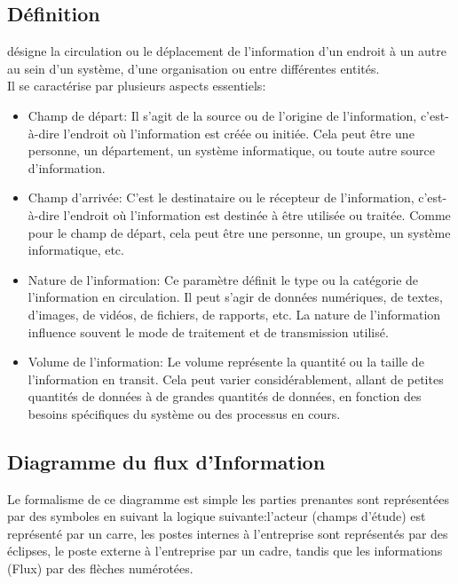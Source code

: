     \subsection{Définition}
        désigne la circulation ou le déplacement de l'information d'un endroit à un autre au sein d'un système, 
        d'une organisation ou entre différentes entités. \\
        Il se caractérise par plusieurs aspects essentiels:
        \begin{itemize}
            \item Champ de départ: Il s'agit de la source ou de l'origine de l'information, c'est-à-dire l'endroit où l'information est créée ou initiée. Cela peut être une personne, un département, un système informatique, ou toute autre source d'information.
            \item Champ d'arrivée: C'est le destinataire ou le récepteur de l'information, c'est-à-dire l'endroit où l'information est destinée à être utilisée ou traitée. Comme pour le champ de départ, cela peut être une personne, un groupe, un système informatique, etc.
            \item Nature de l'information: Ce paramètre définit le type ou la catégorie de l'information en circulation. Il peut s'agir de données numériques, de textes, d'images, de vidéos, de fichiers, de rapports, etc. La nature de l'information influence souvent le mode de traitement et de transmission utilisé.
            \item Volume de l'information: Le volume représente la quantité ou la taille de l'information en transit. Cela peut varier considérablement, allant de petites quantités de données à de grandes quantités de données, en fonction des besoins spécifiques du système ou des processus en cours.
        \end{itemize}
    \subsection{Diagramme du flux d’Information}
        Le formalisme de ce diagramme est simple les parties prenantes sont
        représentées par des symboles en suivant la logique suivante:l'acteur (champs
        d'étude) est représenté par un carre, les postes internes à l'entreprise sont
        représentés par des éclipses, le poste externe à l'entreprise par un cadre, tandis
        que les informations (Flux) par des flèches numérotées.
